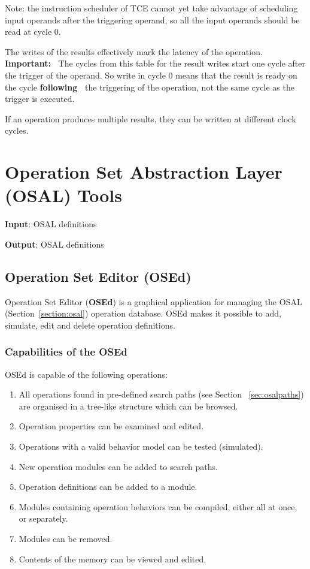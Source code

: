 \documentclass[twoside]{tceusermanual}
\begin{document}
Note: the instruction scheduler of TCE cannot yet take advantage of scheduling 
input operands after the triggering operand, so all the input operands should be 
read at cycle 0.


The writes of the results effectively mark the latency of the operation.
\textbf{Important:\ }
The cycles from this table for the result writes start one cycle after the
trigger of the operand. So write in cycle 0 means that the result is ready
on the cycle \textbf{following\ } the triggering of the operation, 
not the same cycle as the trigger is executed.

If an operation produces multiple results, they can be written at different
clock cycles.

\section{Operation Set Abstraction Layer (OSAL) Tools}
\label{sec:osalTools}

 
\textbf{Input}: OSAL definitions 

\textbf{Output}: OSAL definitions

\subsection{Operation Set Editor (OSEd)}
\label{sec:osed}

Operation Set Editor (\textbf{OSEd}) is a graphical application for managing
the OSAL (Section~\ref{section:osal}) operation database. OSEd makes it possible
to add, simulate, edit and delete operation definitions. 

\subsubsection{Capabilities of the OSEd}

OSEd is capable of the following operations:

\begin{enumerate}
\item%
  All operations found in pre-defined search paths (see Section
  ~\ref{sec:osalpaths}) are organised in a tree-like structure which can be
  browsed.
\item%
  Operation properties can be examined and edited.
\item%
  Operations with a valid behavior model can be tested (simulated).
\item%
  New operation modules can be added to search paths.
\item%
  Operation definitions can be added to a module.
\item%
  Modules containing operation behaviors can be compiled, either all at
  once, or separately.
\item%
  Modules can be removed.
\item%
  Contents of the memory can be viewed and edited.
\end{enumerate}
\end{document}
